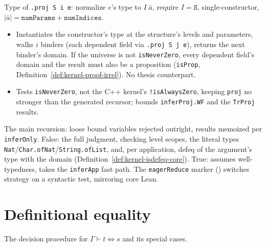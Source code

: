 \begin{definition}
\label{def:kernel-infer-proj}
\leanok
{}
 Type of \texttt{.proj S i e}: normalize $e$'s type to $I\;\bar a$, require $I =
\texttt{S}$, single-constructor, $|\bar a| = \texttt{numParams}+\texttt{numIndices}$.
\begin{itemize}
\item Instantiates the constructor's type at the structure's levels and parameters, walks $i$
binders (each dependent field via \texttt{.proj S j e}), returns the next binder's domain. If the
universe is not \texttt{isNeverZero}, every dependent field's domain and the result must also be a
proposition (\texttt{isProp}, Definition~\ref{def:kernel-proof-irrel}). No thesis counterpart.
\item {} Tests \texttt{isNeverZero}, not the C++ kernel's \texttt{!isAlwaysZero},
keeping \texttt{proj} no stronger than the generated recursor; bounds \texttt{inferProj.WF} and
the \texttt{TrProj} results.
\end{itemize}
\end{definition}

\begin{definition}
\label{def:kernel-infer-type}
\leanok
{}

 The main recursion: loose bound variables rejected outright, results memoized per
\texttt{inferOnly}. False: the full judgment, checking level scopes, the literal types
\texttt{Nat}/\texttt{Char.ofNat}/\texttt{String.ofList}, and, per application, defeq of the
argument's type with the domain (Definition~\ref{def:kernel-isdefeq-core}). True: assumes
well-typedness, takes the \texttt{inferApp} fast path. The \texttt{eagerReduce} marker
() switches strategy on a
syntactic test, mirroring core Lean.
\end{definition}

\section{Definitional equality}

The decision procedure for $\Gamma \vdash t \Leftrightarrow s$ and its special cases.

